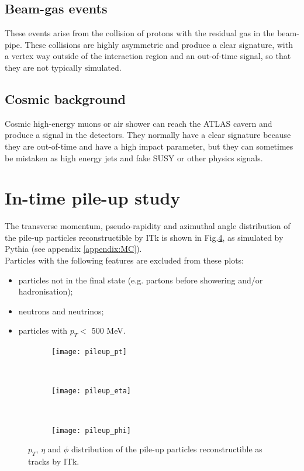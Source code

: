 \documentclass[a4paper,twoside,12pt]{book}
\begin{document}
\subsection*{Beam-gas events}
These events arise from the collision of protons with the residual gas in the beam-pipe. These
collisions are highly asymmetric and produce a clear signature, with a vertex way outside of
the interaction region and an out-of-time signal, so that they are not typically simulated\cite{ATLAS_pileup}.

\subsection*{Cosmic background}
Cosmic high-energy muons or air shower can reach the ATLAS cavern and produce a signal in the detectors.
They normally have a clear signature because they are out-of-time and have a high impact
parameter, but they can sometimes
be mistaken as high energy jets and fake SUSY or other physics signals\cite{ATLAS_cosmic}. \\

\section{In-time pile-up study}

The transverse momentum, pseudo-rapidity and azimuthal angle distribution of the pile-up particles reconstructible by ITk is shown in Fig.\ref{fig:pileupDists}, as simulated by 
Pythia (see appendix \ref{appendix:MC}).\\

Particles with the following
features are excluded from these plots:

\begin{itemize}
\item particles not in the final state (e.g. partons before showering and/or hadronisation);
\item neutrons and neutrinos;
\item particles with $p_{T} <$ 500 MeV.
\end{itemize}

\begin{figure}
\begin{subfigure}{\linewidth}
\centering
\texttt{[image: pileup\_pt]}
\caption{}
\label{fig:pileup_pt}
\end{subfigure}\\[1ex]
\begin{subfigure}{\linewidth}
\centering
\texttt{[image: pileup\_eta]}
\caption{}
\label{fig:pileup_eta}
\end{subfigure}\\[1ex]
\begin{subfigure}{\linewidth}
\centering
\texttt{[image: pileup\_phi]}
\caption{}
\label{fig:pileup_phi}
\end{subfigure}
\caption{$p_{T}$, $\eta$ and $\phi$ distribution of the pile-up particles reconstructible as tracks by ITk.}
\label{fig:pileupDists}
\end{figure}
\end{document}
